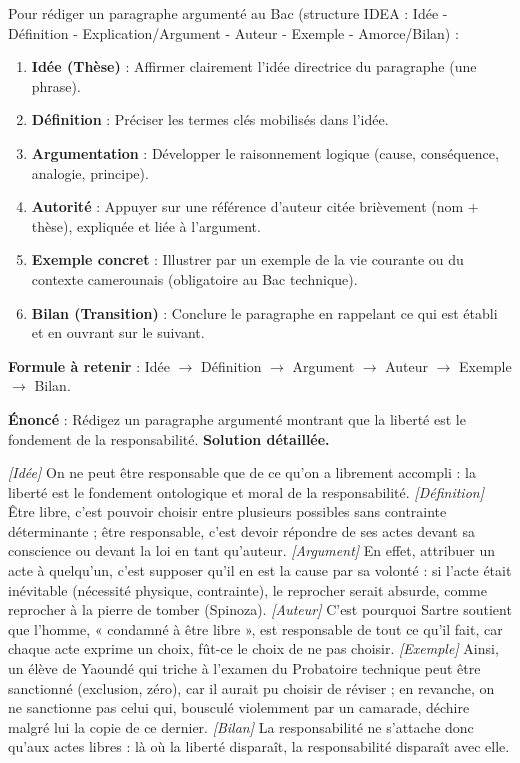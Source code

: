\documentclass[11pt]{article}
\begin{document}
\begin{methode}
Pour rédiger un paragraphe argumenté au Bac (structure IDEA : Idée - Définition - Explication/Argument - Auteur - Exemple - Amorce/Bilan) :
\begin{enumerate}
\item \textbf{Idée (Thèse)} : Affirmer clairement l'idée directrice du paragraphe (une phrase).
\item \textbf{Définition} : Préciser les termes clés mobilisés dans l'idée.
\item \textbf{Argumentation} : Développer le raisonnement logique (cause, conséquence, analogie, principe).
\item \textbf{Autorité} : Appuyer sur une référence d'auteur citée brièvement (nom + thèse), expliquée et liée à l'argument.
\item \textbf{Exemple concret} : Illustrer par un exemple de la vie courante ou du contexte camerounais (obligatoire au Bac technique).
\item \textbf{Bilan (Transition)} : Conclure le paragraphe en rappelant ce qui est établi et en ouvrant sur le suivant.
\end{enumerate}
\textbf{Formule à retenir} : Idée $\rightarrow$ Définition $\rightarrow$ Argument $\rightarrow$ Auteur $\rightarrow$ Exemple $\rightarrow$ Bilan.
\end{methode}

\begin{exoresolu}
\textbf{Énoncé} : Rédigez un paragraphe argumenté montrant que la liberté est le fondement de la responsabilité.
\tcblower
\textbf{Solution détaillée.}

\textit{[Idée]} On ne peut être responsable que de ce qu'on a librement accompli : la liberté est le fondement ontologique et moral de la responsabilité. \textit{[Définition]} Être libre, c'est pouvoir choisir entre plusieurs possibles sans contrainte déterminante ; être responsable, c'est devoir répondre de ses actes devant sa conscience ou devant la loi en tant qu'auteur. \textit{[Argument]} En effet, attribuer un acte à quelqu'un, c'est supposer qu'il en est la cause par sa volonté : si l'acte était inévitable (nécessité physique, contrainte), le reprocher serait absurde, comme reprocher à la pierre de tomber (Spinoza). \textit{[Auteur]} C'est pourquoi Sartre soutient que l'homme, « condamné à être libre », est responsable de tout ce qu'il fait, car chaque acte exprime un choix, fût-ce le choix de ne pas choisir. \textit{[Exemple]} Ainsi, un élève de Yaoundé qui triche à l'examen du Probatoire technique peut être sanctionné (exclusion, zéro), car il aurait pu choisir de réviser ; en revanche, on ne sanctionne pas celui qui, bousculé violemment par un camarade, déchire malgré lui la copie de ce dernier. \textit{[Bilan]} La responsabilité ne s'attache donc qu'aux actes libres : là où la liberté disparaît, la responsabilité disparaît avec elle.
\end{exoresolu}
\end{document}

